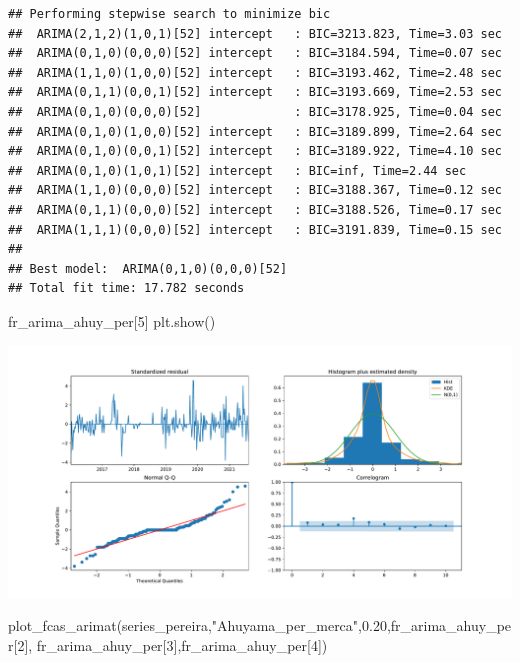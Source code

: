 \documentclass[
]{book}
\newenvironment{Shaded}{\begin{snugshade}}{\end{snugshade}}
\newcommand{\DecValTok}[1]{\textcolor[rgb]{0.00,0.00,0.81}{#1}}
\newcommand{\FloatTok}[1]{\textcolor[rgb]{0.00,0.00,0.81}{#1}}
\newcommand{\NormalTok}[1]{#1}
\newcommand{\StringTok}[1]{\textcolor[rgb]{0.31,0.60,0.02}{#1}}
\begin{document}
\begin{verbatim}
## Performing stepwise search to minimize bic
##  ARIMA(2,1,2)(1,0,1)[52] intercept   : BIC=3213.823, Time=3.03 sec
##  ARIMA(0,1,0)(0,0,0)[52] intercept   : BIC=3184.594, Time=0.07 sec
##  ARIMA(1,1,0)(1,0,0)[52] intercept   : BIC=3193.462, Time=2.48 sec
##  ARIMA(0,1,1)(0,0,1)[52] intercept   : BIC=3193.669, Time=2.53 sec
##  ARIMA(0,1,0)(0,0,0)[52]             : BIC=3178.925, Time=0.04 sec
##  ARIMA(0,1,0)(1,0,0)[52] intercept   : BIC=3189.899, Time=2.64 sec
##  ARIMA(0,1,0)(0,0,1)[52] intercept   : BIC=3189.922, Time=4.10 sec
##  ARIMA(0,1,0)(1,0,1)[52] intercept   : BIC=inf, Time=2.44 sec
##  ARIMA(1,1,0)(0,0,0)[52] intercept   : BIC=3188.367, Time=0.12 sec
##  ARIMA(0,1,1)(0,0,0)[52] intercept   : BIC=3188.526, Time=0.17 sec
##  ARIMA(1,1,1)(0,0,0)[52] intercept   : BIC=3191.839, Time=0.15 sec
## 
## Best model:  ARIMA(0,1,0)(0,0,0)[52]          
## Total fit time: 17.782 seconds
\end{verbatim}

\begin{Shaded}
\begin{Highlighting}[]
\NormalTok{fr\_arima\_ahuy\_per[}\DecValTok{5}\NormalTok{]}
\NormalTok{plt.show()}
\end{Highlighting}
\end{Shaded}

\includegraphics{bookdown-demo_files/figure-latex/unnamed-chunk-160-153.pdf}

\begin{Shaded}
\begin{Highlighting}[]

\NormalTok{plot\_fcas\_arimat(series\_pereira,}\StringTok{"Ahuyama\_per\_merca"}\NormalTok{,}\FloatTok{0.20}\NormalTok{,fr\_arima\_ahuy\_per[}\DecValTok{2}\NormalTok{],}
\NormalTok{fr\_arima\_ahuy\_per[}\DecValTok{3}\NormalTok{],fr\_arima\_ahuy\_per[}\DecValTok{4}\NormalTok{])}
\end{Highlighting}
\end{Shaded}
\end{document}
